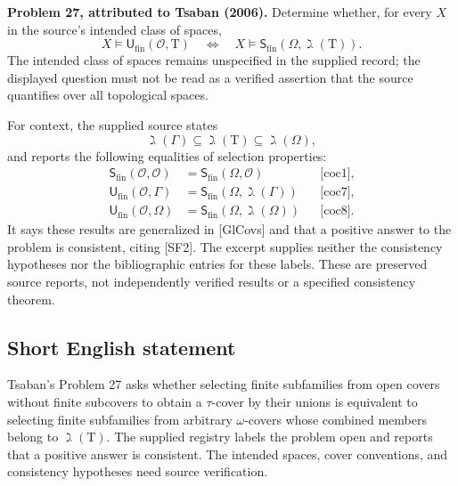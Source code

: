\documentclass[11pt]{article}
\begin{document}
\textbf{Problem 27, attributed to Tsaban (2006).} Determine whether, for every \(X\) in the source's intended class of spaces,
\[
X\models\mathsf U_{\mathrm{fin}}(\mathcal O,\mathrm T)
\quad\Longleftrightarrow\quad
X\models\mathsf S_{\mathrm{fin}}(\Omega,\gimel(\mathrm T)).
\]
The intended class of spaces remains unspecified in the supplied record; the displayed question must not be read as a verified assertion that the source quantifies over all topological spaces.

For context, the supplied source states
\[
\gimel(\Gamma)\subseteq\gimel(\mathrm T)\subseteq\gimel(\Omega),
\]
and reports the following equalities of selection properties:
\begin{align*}
\mathsf S_{\mathrm{fin}}(\mathcal O,\mathcal O)
 &=\mathsf S_{\mathrm{fin}}(\Omega,\mathcal O)
 &&\text{[coc1]},\\
\mathsf U_{\mathrm{fin}}(\mathcal O,\Gamma)
 &=\mathsf S_{\mathrm{fin}}(\Omega,\gimel(\Gamma))
 &&\text{[coc7]},\\
\mathsf U_{\mathrm{fin}}(\mathcal O,\Omega)
 &=\mathsf S_{\mathrm{fin}}(\Omega,\gimel(\Omega))
 &&\text{[coc8]}.
\end{align*}
It says these results are generalized in [GlCovs] and that a positive answer to the problem is consistent, citing [SF2]. The excerpt supplies neither the consistency hypotheses nor the bibliographic entries for these labels. These are preserved source reports, not independently verified results or a specified consistency theorem.
\subsection{Short English statement}
Tsaban's Problem 27 asks whether selecting finite subfamilies from open covers without finite subcovers to obtain a \(\tau\)-cover by their unions is equivalent to selecting finite subfamilies from arbitrary \(\omega\)-covers whose combined members belong to \(\gimel(\mathrm T)\). The supplied registry labels the problem open and reports that a positive answer is consistent. The intended spaces, cover conventions, and consistency hypotheses need source verification.
\end{document}
